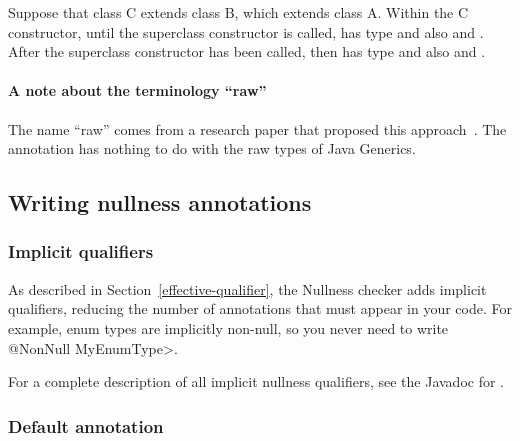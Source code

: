 
Suppose that class C extends class B, which extends class A.  Within the C
constructor, until the superclass constructor is called,  has
type  and also  and .  After the
superclass constructor has been called, then  has type
 and also  and .



\paragraph{A note about the terminology ``raw''}

The name ``raw'' comes from a research paper that proposed this
approach~\cite{FahndrichL2003}.  The 
annotation has nothing to do with the raw types of Java Generics.



\subsection{Writing nullness annotations\label{writing-nullness-annotations}}

\subsubsection{Implicit qualifiers}

As described in Section~\ref{effective-qualifier}, the Nullness checker
adds implicit qualifiers, reducing the number of annotations that must
appear in your code.
For example, enum types are implicitly non-null, so you never need to write
\<@NonNull MyEnumType>.

For a complete description of all implicit nullness qualifiers, see the
Javadoc for .



\subsubsection{Default annotation\label{null-defaults}}

